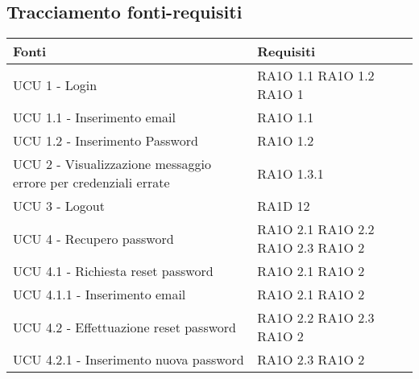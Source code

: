 \subsection{Tracciamento fonti-requisiti}
      \begin{center}
      \bgroup
      \def\arraystretch{1.8}
      \begin{longtable}{ | p{5cm} | p{5cm} |}
    
      \cellcolor[gray]{0.9} \textbf{Fonti} & \cellcolor[gray]{0.9} \textbf{Requisiti} \\ \hline       
            UCU 1 - Login &  RA1O 1.1 \newline  RA1O 1.2 \newline  RA1O 1 \newline  \\ \hline      
            UCU 1.1 - Inserimento email &  RA1O 1.1 \newline  \\ \hline      
            UCU 1.2 - Inserimento Password &  RA1O 1.2 \newline  \\ \hline      
            UCU 2 - Visualizzazione messaggio errore per credenziali errate &  RA1O 1.3.1 \newline  \\ \hline      
            UCU 3 - Logout &  RA1D 12 \newline  \\ \hline      
            UCU 4 - Recupero password &  RA1O 2.1 \newline  RA1O 2.2 \newline  RA1O 2.3 \newline  RA1O 2 \newline  \\ \hline      
            UCU 4.1 - Richiesta reset password &  RA1O 2.1 \newline  RA1O 2 \newline  \\ \hline      
            UCU 4.1.1 - Inserimento email &  RA1O 2.1 \newline  RA1O 2 \newline  \\ \hline      
            UCU 4.2 - Effettuazione reset password &  RA1O 2.2 \newline  RA1O 2.3 \newline  RA1O 2 \newline  \\ \hline      
            UCU 4.2.1 - Inserimento nuova password &  RA1O 2.3 \newline  RA1O 2 \newline  \\ \hline      

\end{longtable}
\end{center}
